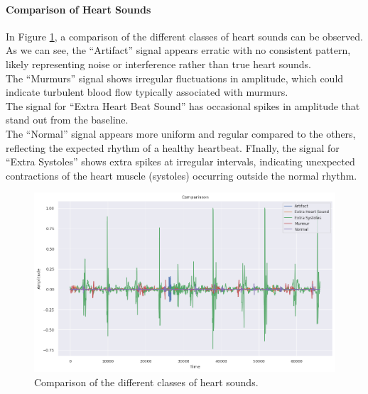 \paragraph{Comparison of Heart Sounds}
In Figure \ref{fig:comparison_heart_beat_audio}, a comparison of the different classes of heart sounds can be observed.\\
As we can see, the “Artifact” signal appears erratic with no consistent pattern, likely representing noise or interference rather than true heart sounds.\\
The “Murmurs” signal shows irregular fluctuations in amplitude, which could indicate turbulent blood flow typically associated with murmurs. \\
The signal for “Extra Heart Beat Sound” has occasional spikes in amplitude that stand out from the baseline.\\
The “Normal” signal appears more uniform and regular compared to the others, reflecting the expected rhythm of a healthy heartbeat.
FInally, the signal for “Extra Systoles” shows extra spikes at irregular intervals,
indicating unexpected contractions of the heart muscle (systoles) occurring outside the normal rhythm.

\begin{figure}[H]
    \centering
    \includegraphics[width=.9\columnwidth]{../images/comparison_heart_beat_audio.png}
    \caption{Comparison of the different classes of heart sounds.}
    \label{fig:comparison_heart_beat_audio}
\end{figure}

